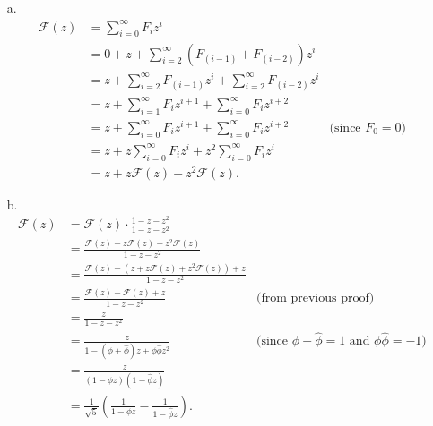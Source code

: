 \documentclass{report}
\makeatletter
\renewenvironment{framed}{%
 \def\FrameCommand##1{\hskip\@totalleftmargin
 \fboxsep=\FrameSep\fbox{##1}}%
 \MakeFramed {\advance\hsize-\width
   \@totalleftmargin\z@ \linewidth\hsize
   \@setminipage}}%
 {\par\unskip\endMakeFramed}
\makeatother
\begin{document}
\begin{enumerate}
\begin{framed}
  \begin{enumerate}
    \item[a.]
      \begin{equation*}
      \begin{aligned}
        \mathcal{F}(z) &= \sum_{i = 0}^{\infty} F_i z^i\\
                       &= 0 + z + \sum_{i = 2}^{\infty} (F_{(i - 1)} + F_{(i - 2)}) z^i\\
                       &= z + \sum_{i = 2}^{\infty} F_{(i - 1)} z^i + \sum_{i = 2}^{\infty} F_{(i - 2)} z^i\\
                       &= z + \sum_{i = 1}^{\infty} F_i z^{i + 1} + \sum_{i = 0}^{\infty} F_i z^{i + 2}\\
                       &= z + \sum_{i = 0}^{\infty} F_i z^{i + 1} + \sum_{i = 0}^{\infty} F_i z^{i + 2} & \text{(since $F_0 = 0$)}\\
                       &= z + z \sum_{i = 0}^{\infty} F_i z^{i} + z^2 \sum_{i = 0}^{\infty} F_i z^{i}\\
                       &= z + z \mathcal{F}(z) + z^2 \mathcal{F}(z).
      \end{aligned}
      \end{equation*}
    \newpage
    \item[b.]
      \begin{equation*}
        \begin{aligned}
          \mathcal{F}(z) &= \mathcal{F}(z) \cdot \frac{1 - z - z^2}{1 - z - z^2}\\
                         &= \frac{\mathcal{F}(z) - z\mathcal{F}(z) - z^2 \mathcal{F}(z)}{1 - z - z^2}\\
                         &= \frac{\mathcal{F}(z) - (z + z \mathcal{F}(z) + z^2 \mathcal{F}(z)) + z}{1 - z - z^2}\\
                         &= \frac{\mathcal{F}(z) - \mathcal{F}(z) + z}{1 - z - z^2} & \text{(from previous proof)}\\
                         &= \frac{z}{1 - z - z^2}\\
                         &= \frac{z}{1 - (\phi + \hat\phi)z + \phi \hat\phi z^2}
                         & \text{(since $\phi + \hat\phi = 1$ and $\phi \hat\phi = -1$)}\\
                         &= \frac{z}{(1 - \phi z)(1 - \hat\phi z)}\\
                         &= \frac{1}{\sqrt 5} \left(\frac{1}{1 - \phi z} - \frac{1}{1 - \hat\phi z}\right).

\end{aligned}
\end{equation*}
\end{enumerate}
\end{framed}
\end{enumerate}
\end{document}
